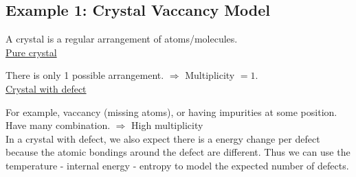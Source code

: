 \documentclass[class=article, crop=false, 12pt]{standalone}
\begin{document}
\subsection{Example 1: Crystal Vaccancy Model}

A crystal is a regular arrangement of atoms/molecules.\\

\ul{Pure crystal}


There is only 1 possible arrangement. 
$\Rightarrow$ Multiplicity $=1$.\\


\ul{Crystal with defect}



For example, vaccancy (missing atoms),
or having impurities at some position.
Have many combination.
$\Rightarrow$ High multiplicity\\


In a crystal with defect, 
we also expect there is a energy change per defect because 
the atomic bondings around the defect are different.
Thus we can use the temperature - internal energy - entropy
to model the expected number of defects.
\end{document}
